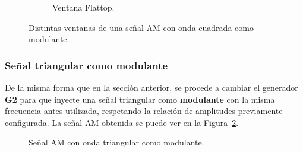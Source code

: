 \begin{figure}[H]
        \begin{subfigure}[H]{0.48\textwidth}
          \caption{Ventana Flattop.}
        \end{subfigure}
      
        \caption{Distintas ventanas de una señal AM con onda cuadrada como modulante.}
        \label{fig:VentanasSeñalAMCuad}
      \end{figure}


    \subsubsection{Señal triangular como modulante}
      De la misma forma que en la sección anterior, se procede a cambiar el generador \textbf{G2} para que 
      inyecte una señal triangular como \textbf{modulante} con la misma frecuencia antes utilizada, 
      respetando la relación de amplitudes previamente configurada. La señal AM obtenida se puede ver en la 
      Figura~\ref{fig:SeñalAMConTriangular}.

      \begin{figure}[H]
        \centering
        \caption{Señal AM con onda triangular como modulante.}
        \label{fig:SeñalAMConTriangular}
      \end{figure}

